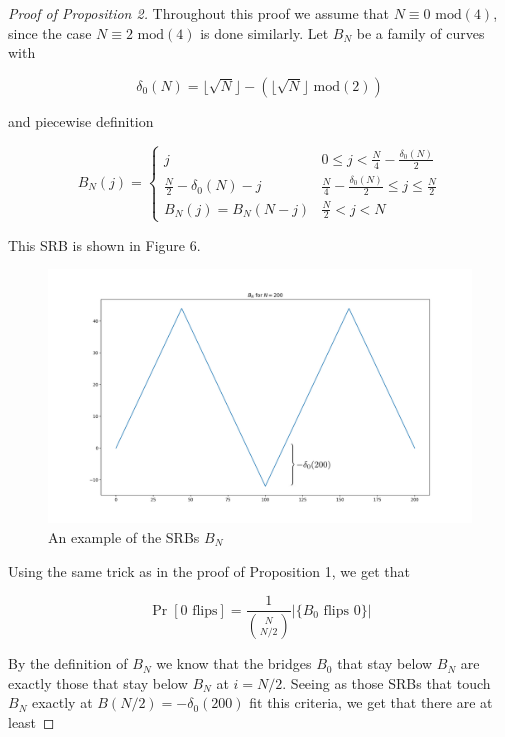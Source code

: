 \documentclass{article}
\theoremstyle{definition}
\begin{document}
\begin{proof}[Proof of Proposition 2] Throughout this proof we assume that $N\equiv0\,\,\mathrm{mod}(4)$, since the case $N\equiv 2\,\,\mathrm{mod}(4)$ is done similarly. Let $B_N$ be a family of curves with

$$\delta_0(N)=\lfloor \sqrt{N}\rfloor - (\lfloor \sqrt{N}\rfloor\,\,\mathrm{mod}(2))$$

and piecewise definition

\begin{equation*}
B_N(j)=
\begin{cases}
j & 0\leq j < \frac{N}{4}-\frac{\delta_0(N)}{2}\\
\frac{N}{2}-\delta_0(N)-j & \frac{N}{4}-\frac{\delta_0(N)}{2}\leq j \leq \frac{N}{2}\\
B_N(j)=B_N(N-j) & \frac{N}{2}<j<N
\end{cases}
\end{equation*}


This SRB is shown in Figure 6.

\begin{figure}[h!]
\caption{An example of the SRBs $B_N$}
\centering
\includegraphics[width=\textwidth]{Figure_6}
\end{figure}

Using the same trick as in the proof of Proposition 1, we get that

\begin{equation*}
\Pr[0\,\,\mathrm{flips}]=\frac{1}{{N \choose N/2}}|\{B_0 \,\, \mathrm{flips\,\, }0\}|
\end{equation*}

By the definition of $B_N$ we know that the bridges $B_0$ that stay below $B_N$ are exactly those that stay below $B_N$ at $i=N/2$. Seeing as those SRBs that touch $B_N$ exactly at $B(N/2)=-\delta_0(200)$ fit this criteria, we get that there are at least


\end{proof}
\end{document}
